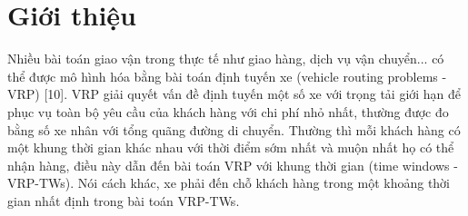 \chapter{Giới thiệu}
Nhiều bài toán giao vận trong thực tế như giao hàng, dịch vụ vận chuyển... có thể được mô hình hóa bằng bài toán định tuyến xe (vehicle routing problems - VRP) [10]. VRP giải quyết vấn đề định tuyến một số xe với trọng tải giới hạn để phục vụ toàn bộ yêu cầu của khách hàng với chi phí nhỏ nhất, thường được đo bằng số xe nhân với tổng quãng đường di chuyển. Thường thì mỗi khách hàng có một khung thời gian khác nhau với thời điểm sớm nhất và muộn nhất họ có thể nhận hàng, điều này dẫn đến bài toán VRP với khung thời gian (time windows - VRP-TWs). Nói cách khác, xe phải đến chỗ khách hàng trong một khoảng thời gian nhất định trong bài toán VRP-TWs.